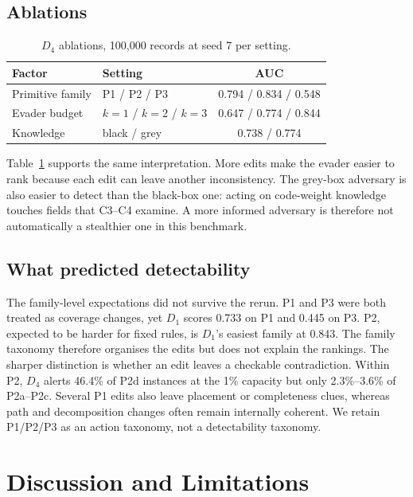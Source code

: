 \documentclass[conference]{IEEEtran}
\begin{document}
\subsection{Ablations}
\begin{table}[!t]
\caption{$D_4$ ablations, 100,000 records at seed 7 per setting.}
\label{tab:ablations}
\centering
\scriptsize
\begin{tabular}{@{}llc@{}}
\toprule
Factor & Setting & AUC \\
\midrule
Primitive family & P1 / P2 / P3 & 0.794 / 0.834 / 0.548 \\
Evader budget & $k=1$ / $k=2$ / $k=3$ & 0.647 / 0.774 / 0.844 \\
Knowledge & black / grey & 0.738 / 0.774 \\
\bottomrule
\end{tabular}
\end{table}
Table~\ref{tab:ablations} supports the same interpretation. More edits make the
evader easier to rank because each edit can leave another inconsistency. The
grey-box adversary is also easier to detect than the black-box one: acting on
code-weight knowledge touches fields that C3--C4 examine. A more informed
adversary is therefore not automatically a stealthier one in this benchmark.
\subsection{What predicted detectability}
The family-level expectations did not survive the rerun. P1 and P3 were both
treated as coverage changes, yet $D_1$ scores 0.733 on P1 and 0.445 on P3. P2,
expected to be harder for fixed rules, is $D_1$'s easiest family at 0.843. The
family taxonomy therefore organises the edits but does not explain the
rankings. The sharper distinction is whether an edit leaves a checkable
contradiction. Within P2, $D_4$ alerts 46.4\% of P2d instances at the 1\%
capacity but only 2.3\%--3.6\% of P2a--P2c. Several P1 edits also leave
placement or completeness clues, whereas path and decomposition changes often
remain internally coherent. We retain P1/P2/P3 as an action taxonomy, not a
detectability taxonomy.
\section{Discussion and Limitations}
\end{document}
